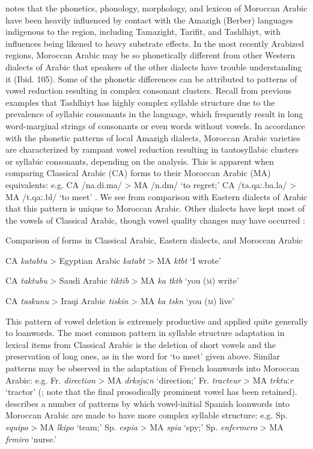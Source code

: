   \citet{Chtatou1997} notes that the phonetics, phonology, morphology, and lexicon of Moroccan Arabic have been heavily influenced by contact with the Amazigh (Berber) languages indigenous to the region, including Tamazight, Tarifit, and Tashlhiyt, with influences being likened to heavy substrate effects. In the most recently Arabized regions, Moroccan Arabic may be so phonetically different from other Western dialects of Arabic that speakers of the other dialects have trouble understanding it (Ibid. 105). Some of the phonetic differences can be attributed to patterns of vowel reduction resulting in complex consonant clusters. Recall from previous examples that Tashlhiyt has highly complex syllable structure due to the prevalence of syllabic consonants in the language, which frequently result in long word-marginal strings of consonants or even words without vowels. In accordance with the phonetic patterns of local Amazigh dialects, Moroccan Arabic varieties are characterized by rampant vowel reduction resulting in tautosyllabic clusters or syllabic consonants, depending on the analysis. This is apparent when comparing Classical Arabic (CA) forms to their Moroccan Arabic (MA) equivalents: e.g. CA /na.di.ma/ > MA /n.dm/ ‘to regret;’ CA /ta.qaː.ba.la/ > MA /t.qaː.bl/ ‘to meet’ \citep[110]{Chtatou1997}. We see from comparison with Eastern dialects of Arabic that this pattern is unique to Moroccan Arabic. Other dialects have kept most of the vowels of Classical Arabic, though vowel quality changes may have occurred :

\ea\label{ex:8.5}
  Comparison of forms in Classical Arabic, Eastern dialects, and Moroccan Arabic

  CA \textit{katabtu} > Egyptian Arabic \textit{katabt} > MA \textit{ktbt} ‘I wrote’ 

  CA \textit{taktubu} > Saudi Arabic \textit{tiktib} > MA \textit{ka tktb} ‘you (\textsc{m}) write’

  CA \textit{taskunu} > Iraqi Arabic \textit{tiskin} > MA \textit{ka tskn} ‘you (\textsc{m}) live’
\citep[111--112]{Chtatou1997}
\z

This pattern of vowel deletion is extremely productive and applied quite generally to loanwords. The most common pattern in syllable structure adaptation in lexical items from Classical Arabic is the deletion of short vowels and the preservation of long ones, as in the word for ‘to meet’ given above. Similar patterns may be observed in the adaptation of French loanwords into Moroccan Arabic: e.g. Fr. \textit{direction} > MA \textit{drksjuːn} ‘direction;’ Fr. \textit{tracteur} > MA \textit{trktu}ː\textit{r} ‘tractor’ (\citealt[116]{Chtatou1997}; note that the final prosodically prominent vowel has been retained). \citet{Sayahi2005} describes a number of patterns by which vowel-initial Spanish loanwords into Moroccan Arabic are made to have more complex syllable structure: e.g. Sp. \textit{equipo} > MA \textit{lkipo} ‘team;’ Sp. \textit{espia} > MA \textit{spia} ‘spy;’ Sp. \textit{enfermero} > MA \textit{frmiro} ‘nurse.’


